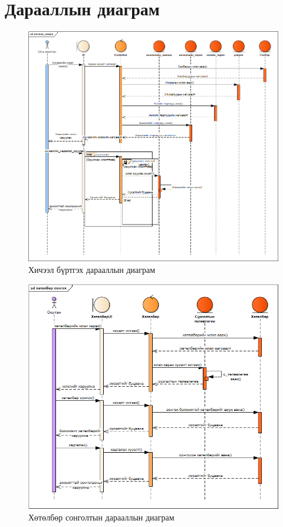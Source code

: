 \newpage
\section{Дарааллын диаграм}
\begin{figure}
	\centering
	\includegraphics[angle=90,scale=0.6]{Diagrams/sequence_SA_ajiltan_hicheel_bvrtgeh}
	\caption[Хичээл бүртгэх дарааллын диаграм]{Хичээл бүртгэх дарааллын диаграм}
	\label{text}
\end{figure}
\begin{figure}
	\centering
	\includegraphics[angle=90,scale=0.65]{Diagrams/sequence_oyutan_hutulbur_songoh}
	\caption[Хөтөлбөр сонголтын дарааллын диаграм]{Хөтөлбөр сонголтын дарааллын диаграм}
	\label{text}
\end{figure}
